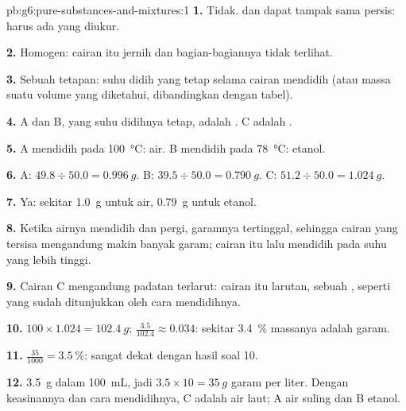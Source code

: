 \begin{solution}{pb:g6:pure-substances-and-mixtures:1}
\textbf{1.} Tidak.  dan  dapat tampak sama
persis: harus ada yang diukur.

\textbf{2.} Homogen: cairan itu jernih dan bagian-bagiannya tidak
terlihat.

\textbf{3.} Sebuah tetapan: suhu didih yang tetap selama cairan
mendidih (atau massa suatu volume yang diketahui, dibandingkan dengan
tabel).

\textbf{4.} A dan B, yang suhu didihnya tetap, adalah . C
adalah .

\textbf{5.} A mendidih pada \qty{100}{\celsius}: air. B mendidih pada
\qty{78}{\celsius}: etanol.

\textbf{6.} A: $49.8 \div 50.0 = \qty{0.996}{g}$. B: $39.5 \div 50.0 =
\qty{0.790}{g}$. C: $51.2 \div 50.0 = \qty{1.024}{g}$.

\textbf{7.} Ya: sekitar \qty{1.0}{g} untuk air, \qty{0.79}{g} untuk
etanol.

\textbf{8.} Ketika airnya mendidih dan pergi, garamnya tertinggal,
sehingga cairan yang tersisa mengandung makin banyak garam; cairan itu
lalu mendidih pada suhu yang lebih tinggi.

\textbf{9.} Cairan C mengandung padatan terlarut: cairan itu larutan,
sebuah , seperti yang sudah ditunjukkan oleh cara mendidihnya.

\textbf{10.} $100 \times 1.024 = \qty{102.4}{g}$; $\frac{3.5}{102.4}
\approx 0.034$: sekitar \qty{3.4}{\percent} massanya adalah garam.

\textbf{11.} $\frac{35}{1000} = \qty{3.5}{\percent}$: sangat dekat
dengan hasil soal 10.

\textbf{12.} \qty{3.5}{g} dalam \qty{100}{mL}, jadi $3.5 \times 10 =
\qty{35}{g}$ garam per liter. Dengan keasinannya dan cara mendidihnya,
C adalah air laut; A air suling dan B etanol.
\end{solution}

